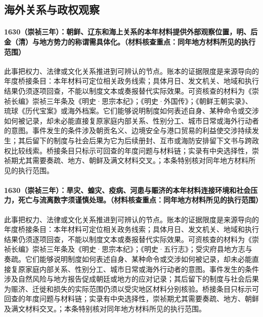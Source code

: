 \subsection{海外关系与政权观察}

\paragraph{1630（崇祯三年）：朝鲜、辽东和海上关系的本年材料提供外部观察位置，明、后金（清）与地方势力的称谓需具体化。（材料核查重点：同年地方材料所见的执行范围）} 此事把权力、法律或文化关系推进到可辨认的节点。账本的证据限度是来源导向的年度桥接条目：本年材料可定位相关政务线索；具体月日、发文机关、地域和执行结果仍须逐项回查，不能以制度文本或奏报替代实际效果。可资核查的材料为《崇祯长编》崇祯三年条及《明史·思宗本纪》；《明史·外国传》；《朝鲜王朝实录》、琉球《历代宝案》或海外档案。它们能够说明制度如何表述自身、某种命令或交涉如何被记录，却未必能直接复原家庭内部关系、性别分工、城市日常或海外行动者的意图。事件发生的条件涉及朝贡名义、边境安全与港口贸易的利益使交涉持续发生；其后留下的制度与社会后果为它为后续册封、互市或海防安排留下文书与跨政权比较线索。桥接条目只标示可回查的年度问题与材料链；实录有中央选择性，崇祯期尤其需要奏疏、地方、朝鲜及满文材料交叉。；本条特别核对同年地方材料所见的执行范围。

\paragraph{1630（崇祯三年）：旱灾、蝗灾、疫病、河患与赈济的本年材料连接环境和社会压力，死亡与流离数字须谨慎处理。（材料核查重点：同年地方材料所见的执行范围）} 此事把权力、法律或文化关系推进到可辨认的节点。账本的证据限度是来源导向的年度桥接条目：本年材料可定位相关政务线索；具体月日、发文机关、地域和执行结果仍须逐项回查，不能以制度文本或奏报替代实际效果。可资核查的材料为《崇祯长编》崇祯三年条及《明史·思宗本纪》；《明史·五行志》；受灾府县地方志与奏疏。它们能够说明制度如何表述自身、某种命令或交涉如何被记录，却未必能直接复原家庭内部关系、性别分工、城市日常或海外行动者的意图。事件发生的条件涉及自然风险与地方报告促成朝廷或地方的应对记录；其后留下的制度与社会后果为赈济、迁徙和损失的实际范围仍须以受灾地区材料分别核验。桥接条目只标示可回查的年度问题与材料链；实录有中央选择性，崇祯期尤其需要奏疏、地方、朝鲜及满文材料交叉。；本条特别核对同年地方材料所见的执行范围。

